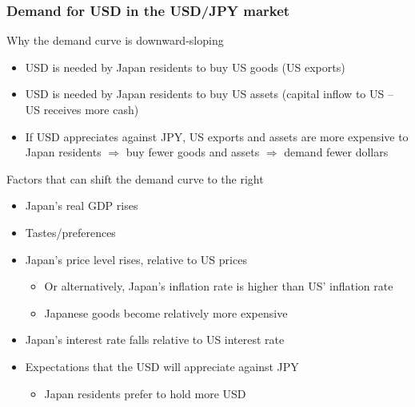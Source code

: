 \documentclass{article}
\begin{document}
\begin{multicols}{2}
\subsubsection{Demand for USD in the USD/JPY market}
Why the demand curve is downward-sloping
\begin{itemize}
	\item USD is needed by Japan residents to buy US goods (US exports)
	\item USD is needed by Japan residents to buy US assets (capital inflow to US -- US receives more cash)
	\item If USD appreciates against JPY, US exports and assets are more expensive to Japan residents $\Rightarrow$ buy fewer goods and assets $\Rightarrow$ demand fewer dollars
\end{itemize}
Factors that can shift the demand curve to the right
\begin{itemize}
	\item Japan's real GDP rises
	\item Tastes/preferences
	\item Japan's price level rises, relative to US prices
	\begin{itemize}
		\item Or alternatively, Japan's inflation rate is higher than US' inflation rate
		\item Japanese goods become relatively more expensive
	\end{itemize}
    \item Japan's interest rate falls relative to US interest rate
    \item Expectations that the USD will appreciate against JPY
    \begin{itemize}
    	\item Japan residents prefer to hold more USD
    \end{itemize}
\end{itemize}

\end{multicols}
\end{document}
